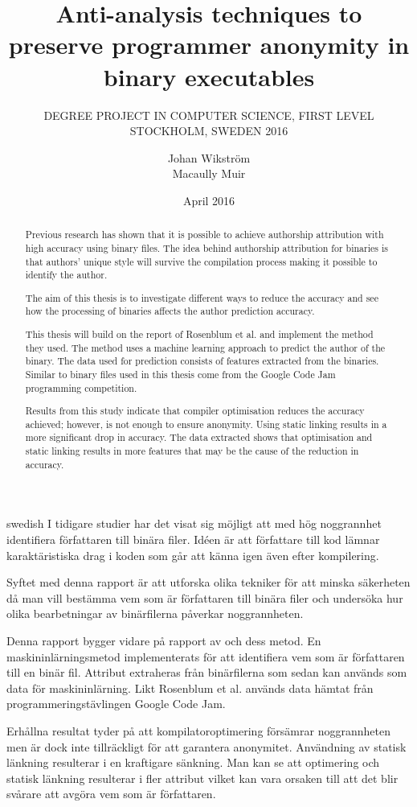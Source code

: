 \documentclass[a4paper,11pt]{kth-mag}
\title{Anti-analysis techniques to preserve programmer anonymity in binary
executables}
\subtitle{
    DEGREE PROJECT IN COMPUTER SCIENCE, FIRST LEVEL \\
    STOCKHOLM, SWEDEN 2016
}
\author{Johan Wikström \\ Macaully Muir}
\date{April 2016}
\begin{document}
\frontmatter
\pagestyle{empty}
\removepagenumbers
\maketitle
{}
\begin{abstract}
Previous research has shown that it is possible to achieve authorship
attribution with high accuracy using binary files. The idea behind authorship
attribution for binaries is that authors’ unique style will survive the
compilation process making it possible to identify the author.    

The aim of this thesis is to investigate different ways to reduce the accuracy
and see how the processing of binaries affects the author prediction accuracy.

This thesis will build on the report of Rosenblum et al. and implement the method
they used. The method uses a machine learning approach to predict the author
of the binary. The data used for prediction consists of features extracted from
the binaries. Similar to \parencite{rosenblum2011wrote} binary files used in this
thesis come from the Google Code Jam programming competition.

Results from this study indicate that compiler optimisation reduces the accuracy
achieved; however, is not enough to ensure anonymity. Using static linking
results in a more significant drop in accuracy. The data extracted shows that
optimisation and static linking results in more features that may be the cause
of the reduction in accuracy.
\end{abstract}
\clearpage
\begin{foreignabstract}{swedish}
I tidigare studier har det visat sig möjligt att med hög noggrannhet
identifiera författaren till binära filer. Idéen är att författare till kod
lämnar karaktäristiska drag i koden som går att känna igen även efter
kompilering. 

Syftet med denna rapport är att utforska olika tekniker för att minska
säkerheten då man vill bestämma vem som är författaren till binära filer och
undersöka hur olika bearbetningar av binärfilerna påverkar noggrannheten.     

Denna rapport bygger vidare på rapport av \parencite{rosenblum2011wrote}
och dess metod. En maskininlärningsmetod implementerats för
att identifiera vem som är författaren till en binär fil. Attribut extraheras
från binärfilerna som sedan kan används som data för maskininlärning. Likt
Rosenblum et al. används data hämtat från programmeringstävlingen Google Code
Jam. 

Erhållna resultat tyder på att kompilatoroptimering försämrar noggrannheten men är dock
inte tillräckligt för att garantera anonymitet. Användning av statisk länkning
resulterar i en kraftigare sänkning. Man kan se att optimering och statisk
länkning resulterar i fler attribut vilket kan vara orsaken till att det blir
svårare att avgöra vem som är författaren.
\end{foreignabstract}
\clearpage
\tableofcontents*
\mainmatter
\pagestyle{newchap}
\end{document}
